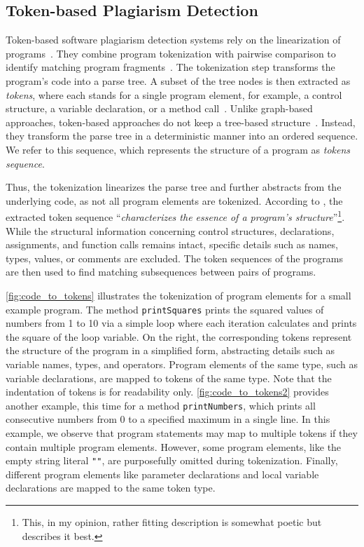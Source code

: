 \subsection{Token-based Plagiarism Detection}\label{sec:TPD}

Token-based software plagiarism detection systems rely on the linearization of programs~\cite{Wan2018}.
They combine program tokenization with pairwise comparison to identify matching program fragments~\cite{Lancaster2005}. 
The tokenization step transforms the program's code into a parse tree. A subset of the tree nodes is then extracted as \textit{tokens}, where each stands for a single program element, for example, a control structure, a variable declaration, or a method call~\cite{prechelt2002}.
Unlike graph-based approaches, token-based approaches do not keep a tree-based structure~\cite{liu2006}. Instead, they transform the parse tree in a deterministic manner into an ordered sequence. We refer to this sequence, which represents the structure of a program as \textit{tokens sequence}.

Thus, the tokenization linearizes the parse tree and further abstracts from the underlying code, as not all program elements are tokenized.
According to \citet{prechelt2002}, the extracted token sequence \enquote{\textit{characterizes the essence of a program's structure}}\footnote{This, in my opinion, rather fitting description is somewhat poetic but describes it best.}.
While the structural information concerning control structures, declarations, assignments, and function calls remains intact, specific details such as names, types, values, or comments are excluded.
The token sequences of the programs are then used to find matching subsequences between pairs of programs.

\autoref{fig:code_to_tokens} illustrates the tokenization of program elements for a small example program.
The method \texttt{printSquares} prints the squared values of numbers from 1 to 10 via a simple loop where each iteration calculates and prints the square of the loop variable. On the right, the corresponding tokens represent the structure of the program in a simplified form, abstracting details such as variable names, types, and operators. Program elements of the same type, such as variable declarations, are mapped to tokens of the same type. Note that the indentation of tokens is for readability only.
\autoref{fig:code_to_tokens2} provides another example, this time for a method \texttt{printNumbers}, which prints all consecutive numbers from 0 to a specified maximum in a single line. In this example, we observe that program statements may map to multiple tokens if they contain multiple program elements. However, some program elements, like the empty string literal \texttt{""}, are purposefully omitted during tokenization. Finally, different program elements like parameter declarations and local variable declarations are mapped to the same token type.

